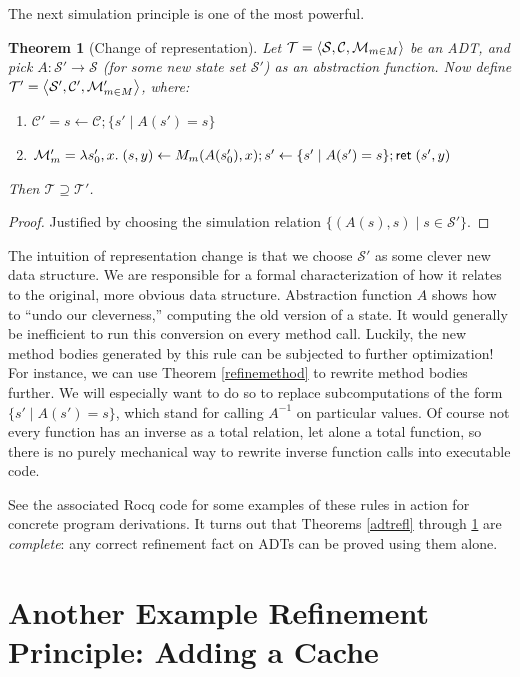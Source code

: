 \documentclass{amsbook}
\newtheorem{theorem}{Theorem}[chapter]
\theoremstyle{definition}
\theoremstyle{remark}
\numberwithin{section}{chapter}
\numberwithin{equation}{chapter}
\begin{document}
The next simulation principle is one of the most powerful.

\begin{theorem}[Change of representation]\label{repchange}
  Let $\mathcal T = {\left \langle \mathcal S, \mathcal C, \mathcal M_{m \in M} \right \rangle}$ be an ADT, and pick $A : \mathcal S' \to \mathcal S$ (for some new state set $\mathcal S'$) as an \emph{abstraction function}.
  Now define $\mathcal T' = {\left \langle \mathcal S', \mathcal C', \mathcal M'_{m \in M} \right \rangle}$, where:
  \begin{enumerate}
  \item $\mathcal C' = s \leftarrow \mathcal C; \{s' \mid A(s') = s\}$
  \item $\mathcal M'_m = \lambda s'_0, x. \; \mathcal (s, y) \leftarrow M_m(A(s'_0), x); s' \leftarrow \{s' \mid A(s') = s\}; \mathsf{ret} \; (s', y)$
  \end{enumerate}
  Then $\mathcal T \supseteq \mathcal T'$.
\end{theorem}
\begin{proof}
  Justified by choosing the simulation relation $\{(A(s), s) \mid s \in \mathcal S'\}$.
\end{proof}

The intuition of representation change is that we choose $\mathcal S'$ as some clever new data structure.
We are responsible for a formal characterization of how it relates to the original, more obvious data structure.
Abstraction function $A$ shows how to ``undo our cleverness,'' computing the old version of a state.
It would generally be inefficient to run this conversion on every method call.
Luckily, the new method bodies generated by this rule can be subjected to further optimization!
For instance, we can use Theorem \ref{refinemethod} to rewrite method bodies further.
We will especially want to do so to replace subcomputations of the form $\{s' \mid A(s') = s\}$, which stand for calling $A^{-1}$ on particular values.
Of course not every function has an inverse as a total relation, let alone a total function, so there is no purely mechanical way to rewrite inverse function calls into executable code.

See the associated Rocq code for some examples of these rules in action for concrete program derivations.
It turns out that Theorems \ref{adtrefl} through \ref{repchange} are \emph{complete}: any correct refinement fact on ADTs can be proved using them alone.

\section{Another Example Refinement Principle: Adding a Cache}
\end{document}
